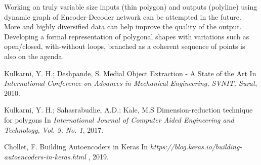 \documentclass{article}
\begin{document}
Working on truly variable size inputs (thin polygon) and outputs (polyline) using dynamic graph of Encoder-Decoder network can be attempted in the future. More and highly diversified data can help improve the quality of the output. Developing a formal representation of polygonal shapes with variations such as open/closed, with-without loops, branched as a coherent sequence of points is also on the agenda.


  


\begin{thebibliography}{1}

Kulkarni, Y. H.; Deshpande, S.
\newblock Medial Object Extraction - A State of the Art
\newblock In {\em International Conference on Advances in Mechanical Engineering, SVNIT, Surat}, 2010.

Kulkarni, Y. H.; Sahasrabudhe, A.D.; Kale, M.S
\newblock Dimension-reduction technique for polygons
\newblock In {\em International Journal of Computer Aided Engineering and Technology, Vol. 9, No. 1}, 2017.

Chollet, F.
\newblock Building Autoencoders in Keras
\newblock In {\em https://blog.keras.io/building-autoencoders-in-keras.html }, 2019.

\end{thebibliography}
\end{document}
